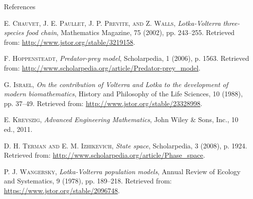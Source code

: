 \documentclass[hyperref={colorlinks,allcolors=black}]{beamer}
\begin{document}
\begin{frame}{References}
\begin{thebibliography}{6}
\scriptsize

  \textsc{E. Chauvet, J. E. Paullet, J. P. Previte, and Z.
    Walls}, \textit{Lotka-Volterra three-species food chain}, Mathematics
    Magazine, 75 (2002), pp. 243–255. Retrieved from:
    \url{http://www.jstor.org/stable/3219158}.

  \textsc{F. Hoppensteadt}, \textit{Predator-prey model},
    Scholarpedia, 1 (2006), p. 1563. Retrieved from:
    \url{http://www.scholarpedia.org/article/Predator-prey_model}.

  \textsc{G. Israel}, \textit{On the contribution of Volterra
    and Lotka to the development of modern biomathematics}, History and
    Philosophy of the Life Sciences, 10 (1988), pp. 37–49. Retrieved from:
    \url{http://www.jstor.org/stable/23328998}.

  \textsc{E. Kreyszig}, \textit{Advanced Engineering
    Mathematics}, John Wiley \& Sons, Inc., 10 ed., 2011.

  \textsc{D. H. Terman and E. M. Izhikevich}, \textit{State
    space}, Scholarpedia, 3 (2008), p. 1924. Retrieved from:
    \url{http://www.scholarpedia.org/article/Phase_space}.

  \textsc{P. J. Wangersky}, \textit{Lotka-Volterra
    population models}, Annual Review of Ecology and Systematics, 9 (1978), pp.
    189–218. Retrieved from: \url{https://www.jstor.org/stable/2096748}.

\end{thebibliography}
\end{frame}
\end{document}
